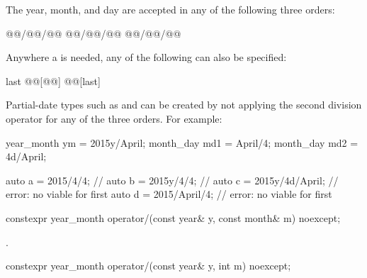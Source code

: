 \pnum
\begin{note}
The year, month, and day are accepted in any of the following three orders:

\begin{codeblock}
@@/@@/@@
@@/@@/@@
@@/@@/@@
\end{codeblock}

Anywhere a  is needed, any of the following can also be specified:

\begin{codeblock}
last
@@[@@]
@@[last]
\end{codeblock}
\end{note}

\pnum
\begin{note}
Partial-date types such as  and 
can be created by not applying the second division operator
for any of the three orders. For example:

\begin{codeblock}
year_month ym = 2015y/April;
month_day md1 = April/4;
month_day md2 = 4d/April;
\end{codeblock}
\end{note}

\pnum
\begin{example}
\begin{codeblock}
auto a = 2015/4/4;          // 
auto b = 2015y/4/4;         // 
auto c = 2015y/4d/April;    // error: no viable  for first \tcode{/}
auto d = 2015/April/4;      // error: no viable  for first \tcode{/}
\end{codeblock}
\end{example}

\begin{itemdecl}
constexpr year_month
  operator/(const year& y, const month& m) noexcept;
\end{itemdecl}

\begin{itemdescr}
\pnum
\returns
{}.
\end{itemdescr}

\begin{itemdecl}
constexpr year_month
  operator/(const year& y, int   m) noexcept;
\end{itemdecl}

